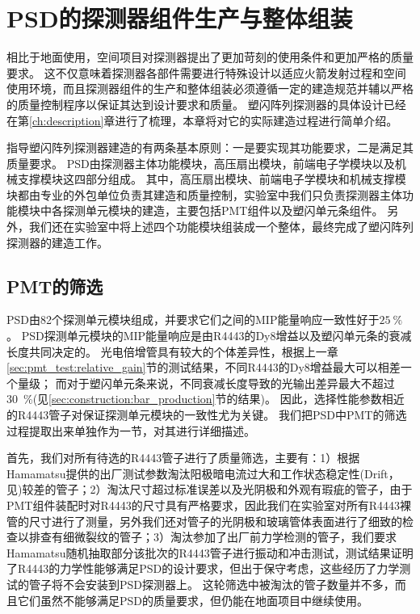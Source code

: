 \chapter{PSD的探测器组件生产与整体组装}
\label{ch:construction}
相比于地面使用，空间项目对探测器提出了更加苛刻的使用条件和更加严格的质量要求。
这不仅意味着探测器各部件需要进行特殊设计以适应火箭发射过程和空间使用环境，而且探测器组件的生产和整体组装必须遵循一定的建造规范并辅以严格的质量控制程序以保证其达到设计要求和质量。
塑闪阵列探测器的具体设计已经在第\ref{ch:description}章进行了梳理，本章将对它的实际建造过程进行简单介绍。

指导塑闪阵列探测器建造的有两条基本原则：一是要实现其功能要求，二是满足其质量要求。
PSD由探测器主体功能模块，高压扇出模块，前端电子学模块以及机械支撑模块这四部分组成。
其中，高压扇出模块、前端电子学模块和机械支撑模块都由专业的外包单位负责其建造和质量控制，实验室中我们只负责探测器主体功能模块中各探测单元模块的建造，主要包括PMT组件以及塑闪单元条组件。
另外，我们还在实验室中将上述四个功能模块组装成一个整体，最终完成了塑闪阵列探测器的建造工作。

\section{PMT的筛选}
\label{sec:construction:pmt_selection}
PSD由82个探测单元模块组成，并要求它们之间的MIP能量响应一致性好于$\SI{25}{\percent}$。
PSD探测单元模块的MIP能量响应是由R4443的Dy8增益以及塑闪单元条的衰减长度共同决定的。
光电倍增管具有较大的个体差异性，根据上一章\ref{sec:pmt_test:relative_gain}节的测试结果，不同R4443的Dy8增益最大可以相差一个量级；
而对于塑闪单元条来说，不同衰减长度导致的光输出差异最大不超过\SI{30}{\percent}(见\ref{sec:construction:bar_production}节的结果)。
因此，选择性能参数相近的R4443管子对保证探测单元模块的一致性尤为关键。
我们把PSD中PMT的筛选过程提取出来单独作为一节，对其进行详细描述。

首先，我们对所有待选的R4443管子进行了质量筛选，主要有：1）根据Hamamatsu提供的出厂测试参数淘汰阳极暗电流过大和工作状态稳定性(Drift，见\parencite{hamamatsu})较差的管子；2）淘汰尺寸超过标准误差以及光阴极和外观有瑕疵的管子，由于PMT组件装配时对R4443的尺寸具有严格要求，因此我们在实验室对所有R4443裸管的尺寸进行了测量，另外我们还对管子的光阴极和玻璃管体表面进行了细致的检查以排查有细微裂纹的管子；3）淘汰参加了出厂前力学检测的管子，我们要求Hamamatsu随机抽取部分该批次的R4443管子进行振动和冲击测试，测试结果证明了R4443的力学性能够满足PSD的设计要求，但出于保守考虑，这些经历了力学测试的管子将不会安装到PSD探测器上。
这轮筛选中被淘汰的管子数量并不多，而且它们虽然不能够满足PSD的质量要求，但仍能在地面项目中继续使用。

